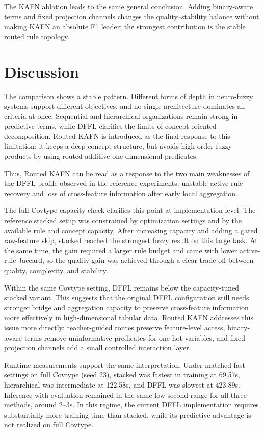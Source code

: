 \documentclass[runningheads]{llncs}
\begin{document}
The KAFN ablation leads to the same general conclusion. Adding binary-aware terms and fixed projection channels changes the quality--stability balance without making KAFN an absolute F1 leader; the strongest contribution is the stable routed rule topology.

\section{Discussion}

The comparison shows a stable pattern. Different forms of depth in neuro-fuzzy systems support different objectives, and no single architecture dominates all criteria at once. Sequential and hierarchical organizations remain strong in predictive terms, while DFFL clarifies the limits of concept-oriented decomposition. Routed KAFN is introduced as the final response to this limitation: it keeps a deep concept structure, but avoids high-order fuzzy products by using routed additive one-dimensional predicates.

Thus, Routed KAFN can be read as a response to the two main weaknesses of the DFFL profile observed in the reference experiments: unstable active-rule recovery and loss of cross-feature information after early local aggregation.

The full Covtype capacity check clarifies this point at implementation level. The reference stacked setup was constrained by optimization settings and by the available rule and concept capacity. After increasing capacity and adding a gated raw-feature skip, stacked reached the strongest fuzzy result on this large task. At the same time, the gain required a larger rule budget and came with lower active-rule Jaccard, so the quality gain was achieved through a clear trade-off between quality, complexity, and stability.

Within the same Covtype setting, DFFL remains below the capacity-tuned stacked variant. This suggests that the original DFFL configuration still needs stronger bridge and aggregation capacity to preserve cross-feature information more effectively in high-dimensional tabular data. Routed KAFN addresses this issue more directly: teacher-guided routes preserve feature-level access, binary-aware terms remove uninformative predicates for one-hot variables, and fixed projection channels add a small controlled interaction layer.

Runtime measurements support the same interpretation. Under matched fast settings on full Covtype (seed 23), stacked was fastest in training at 69.57s, hierarchical was intermediate at 122.58s, and DFFL was slowest at 423.89s. Inference with evaluation remained in the same low-second range for all three methods, around 2--3s. In this regime, the current DFFL implementation requires substantially more training time than stacked, while its predictive advantage is not realized on full Covtype.
\end{document}
